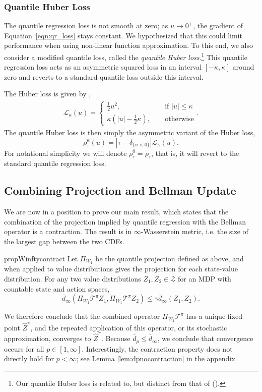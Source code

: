 \documentclass[letterpaper]{article}
\newcommand{\cZ}{\mathcal{Z}}
\newcommand{\cT}{\mathcal{T}}
\newcommand{\cL}{\mathcal{L}}
\def \cTpi {\cT^\pi}
\newcommand{\citet}[1]{\citeauthor{#1} (\citeyear{#1})}
\begin{document}
\subsubsection{Quantile Huber Loss}
The quantile regression loss is not smooth at zero; as $u \to 0^+$, the gradient of Equation~\ref{eqn:qr_loss} stays constant. We hypothesized that this could limit performance when using non-linear function approximation. To this end, we also consider a modified quantile loss, called the \textit{quantile Huber loss}.\footnote{Our quantile Huber loss is related to, but distinct from that of \citet{aravkin2014sparse}.} This quantile regression loss acts as an asymmetric squared loss in an interval $[- \kappa, \kappa]$ around zero and reverts to a standard quantile loss outside this interval.

The Huber loss is given by \cite{huber1964robust},
\begin{align}
    \cL_\kappa(u) = \begin{cases}
        \frac{1}{2} u^2,\quad \ &\text{if } |u| \le \kappa\\
        \kappa(|u| - \frac{1}{2}\kappa),\quad \ &\text{otherwise}
    \end{cases}.
\end{align}
The quantile Huber loss is then simply the asymmetric variant of the Huber loss,
\begin{equation}\label{eqn:huber_quantile}
    \rho^\kappa_\tau(u) = |\tau - \delta_{\{ u < 0 \}}| \cL_\kappa(u).
\end{equation}
For notational simplicity we will denote $\rho^0_\tau = \rho_\tau$, that is, it will revert to the standard quantile regression loss.

\subsection{Combining Projection and Bellman Update}

We are now in a position to prove our main result, which states that the combination of the projection implied by quantile regression with the Bellman operator is a contraction. The result is in $\infty$-Wasserstein metric, i.e. the size of the largest gap between the two CDFs.
\begin{restatable}{prop}{Winftycontract}
Let $\Pi_{W_1}$ be the quantile projection defined as above, and when applied to value distributions gives the projection for each state-value distribution. For any two value distributions $Z_1, Z_2 \in \cZ$ for an MDP with countable state and action spaces,
\begin{equation}
    \bar{d}_\infty(\Pi_{W_1} \cTpi Z_1, \Pi_{W_1} \cTpi Z_2) \le \gamma \bar{d}_\infty (Z_1, Z_2).
\end{equation}
\end{restatable}
We therefore conclude that the combined operator $\Pi_{W_1} \cTpi$ has a unique fixed point $\hat{Z}^\pi$, and the repeated application of this operator, or its stochastic approximation, converges to $\hat{Z}^\pi$. Because ${\bar d}_p \le {\bar d}_\infty$, we conclude that convergence occurs for all $p\in [1,\infty]$. Interestingly, the contraction property does not directly hold for $p < \infty$; see Lemma \ref{lem:dpnocontraction} in the appendix.
\end{document}
